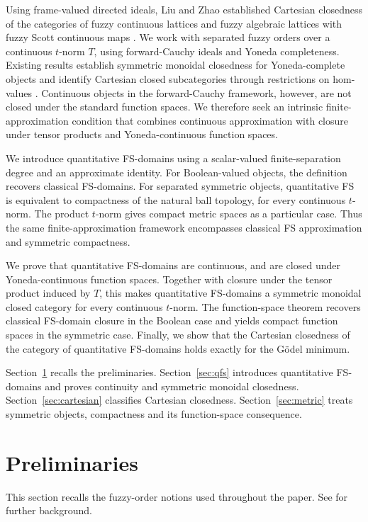 \documentclass[preprint,3p,times]{elsarticle}
\theoremstyle{definition}
\theoremstyle{remark}
\numberwithin{equation}{section}
\begin{document}
Using frame-valued directed ideals, Liu and Zhao established Cartesian closedness of the categories of fuzzy continuous lattices and fuzzy algebraic lattices with fuzzy Scott continuous maps \cite[Theorems~4.9 and~4.12]{LiuZhao2014}. We work with separated fuzzy orders over a continuous \(t\)-norm \(T\), using forward-Cauchy ideals and Yoneda completeness. Existing results establish symmetric monoidal closedness for Yoneda-complete objects \cite{LaiZhang2016} and identify Cartesian closed subcategories through restrictions on hom-values \cite{LaiLuo2025}. Continuous objects in the forward-Cauchy framework, however, are not closed under the standard function spaces. We therefore seek an intrinsic finite-approximation condition that combines continuous approximation with closure under tensor products and Yoneda-continuous function spaces.

We introduce quantitative FS-domains using a scalar-valued finite-separation degree and an approximate identity. For Boolean-valued objects, the definition recovers classical FS-domains. For separated symmetric objects, quantitative FS is equivalent to compactness of the natural ball topology, for every continuous \(t\)-norm. The product \(t\)-norm gives compact metric spaces as a particular case. Thus the same finite-approximation framework encompasses classical FS approximation and symmetric compactness.

We prove that quantitative FS-domains are continuous, and are closed under Yoneda-continuous function spaces. 
Together with closure under the tensor product induced by \(T\), this makes quantitative FS-domains a symmetric monoidal closed category for every continuous \(t\)-norm. 
The function-space theorem recovers classical FS-domain closure in the Boolean case and yields compact function spaces in the symmetric case. Finally, we show that the Cartesian closedness of the category of quantitative FS-domains holds exactly for the G\"odel minimum.

Section~\ref{sec:preliminaries} recalls the preliminaries. Section~\ref{sec:qfs} introduces quantitative FS-domains and proves continuity and symmetric monoidal closedness. Section~\ref{sec:cartesian} classifies Cartesian closedness. Section~\ref{sec:metric} treats symmetric objects, compactness and its function-space consequence.

\section{Preliminaries}\label{sec:preliminaries}
This section recalls the fuzzy-order notions used throughout the paper.  See \cite{LaiZhangZhang2020,Zhang2024} for further background.
\end{document}
